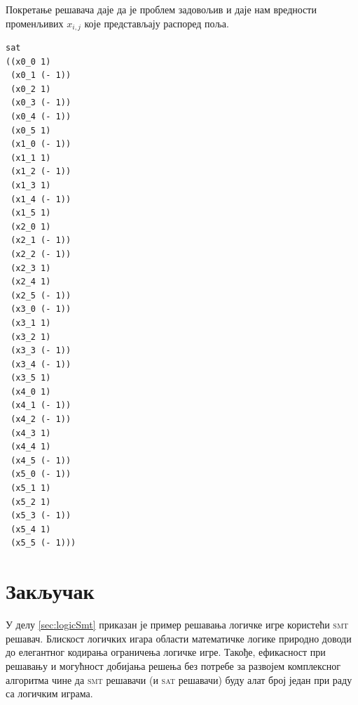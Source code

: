 \documentclass[a4paper]{article}
\begin{document}
Покретање решавача даје да је проблем задовољив и даје нам вредности променљивих $x_{i, j}$ које представљају
распоред поља.

\begin{verbatim}
sat
((x0_0 1)
 (x0_1 (- 1))
 (x0_2 1)
 (x0_3 (- 1))
 (x0_4 (- 1))
 (x0_5 1)
 (x1_0 (- 1))
 (x1_1 1)
 (x1_2 (- 1))
 (x1_3 1)
 (x1_4 (- 1))
 (x1_5 1)
 (x2_0 1)
 (x2_1 (- 1))
 (x2_2 (- 1))
 (x2_3 1)
 (x2_4 1)
 (x2_5 (- 1))
 (x3_0 (- 1))
 (x3_1 1)
 (x3_2 1)
 (x3_3 (- 1))
 (x3_4 (- 1))
 (x3_5 1)
 (x4_0 1)
 (x4_1 (- 1))
 (x4_2 (- 1))
 (x4_3 1)
 (x4_4 1)
 (x4_5 (- 1))
 (x5_0 (- 1))
 (x5_1 1)
 (x5_2 1)
 (x5_3 (- 1))
 (x5_4 1)
 (x5_5 (- 1)))
\end{verbatim}


\newpage
\section{Закључак}
У делу \ref{sec:logicSmt} приказан је пример решавања логичке игре користећи \textsc{smt} решавач. Блискост логичких игара области математичке
логике природно доводи до елегантног кодирања ограничења логичке игре. Такође, ефикасност при решавању и могућност добијања
решења без потребе за развојем комплексног алгоритма чине да \textsc{smt} решавачи (и \textsc{sat} решавачи) буду алат број један при раду
са логичким играма.



\appendix


\end{document}
